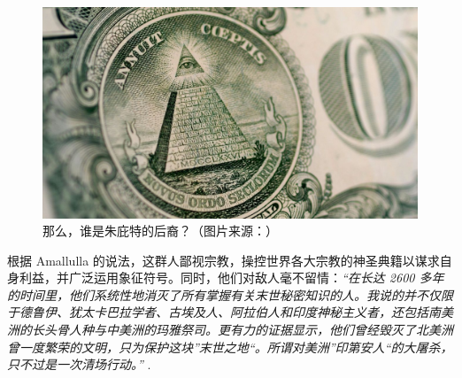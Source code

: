 \documentclass[10pt,twocolumn,letterpaper]{article}
\begin{document}
\begin{figure}[t]
\begin{center}
   \includegraphics[width=1\linewidth]{illuminati.jpg}

\end{center}
   \caption{那么，谁是朱庇特的后裔？（图片来源：\cite{35}）}
\label{fig:10}
\label{fig:onecol}
\end{figure}

根据 Amallulla 的说法，这群人鄙视宗教，操控世界各大宗教的神圣典籍以谋求自身利益，并广泛运用象征符号。同时，他们对敌人毫不留情：\textit{“在长达 2600 多年的时间里，他们系统性地消灭了所有掌握有关末世秘密知识的人。我说的并不仅限于德鲁伊、犹太卡巴拉学者、古埃及人、阿拉伯人和印度神秘主义者，还包括南美洲的长头骨人种与中美洲的玛雅祭司。更有力的证据显示，他们曾经毁灭了北美洲曾一度繁荣的文明，只为保护这块”末世之地“。所谓对美洲”印第安人“的大屠杀，只不过是一次清场行动。”} \cite{33,34}.
\end{document}
